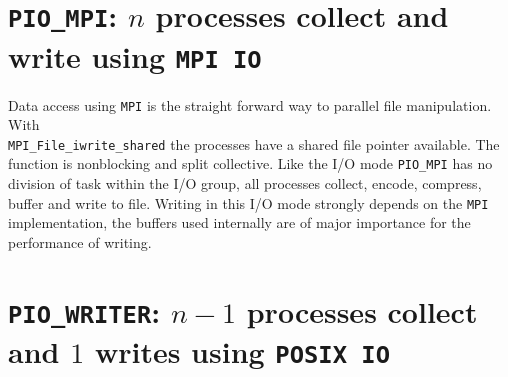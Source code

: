 \section{{\tt PIO\_MPI}: $n$ processes collect and write using {\tt MPI IO}}
\label{PIOMPI}

Data access using {\tt MPI} is the straight forward way to parallel file 
manipulation. With \\
{\tt MPI\_File\_iwrite\_shared} the processes have a shared 
file pointer available. The function is nonblocking and split collective. Like 
{} the I/O mode {\tt PIO\_MPI} has no division 
of task within the I/O group, all processes collect, encode, compress, buffer and 
write to file. Writing in this I/O mode strongly depends on the {\tt MPI} 
implementation, the buffers used internally are of major importance for the 
performance of writing.

\section{{\tt PIO\_WRITER}: $n - 1$ processes collect and $1$ writes using 
{\tt POSIX IO}}
\label{PIOWRITER}


